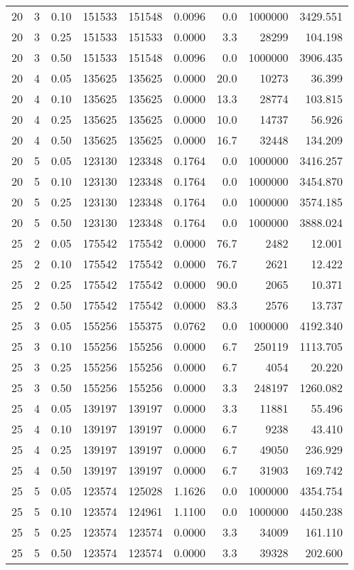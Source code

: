 \begin{table}
\begin{center}
\begin{tabular}{|c|c|c|r|r|c|r|r|r|}
20 & 3 & 0.10 & 151533 & 151548 &  0.0096 & 0.0 & 1000000 & 3429.551 \\
20 & 3 & 0.25 & 151533 & 151533 &  0.0000 & 3.3 & 28299 & 104.198 \\
20 & 3 & 0.50 & 151533 & 151548 &  0.0096 & 0.0 & 1000000 & 3906.435 \\
20 & 4 & 0.05 & 135625 & 135625 &  0.0000 & 20.0 & 10273 & 36.399 \\
20 & 4 & 0.10 & 135625 & 135625 &  0.0000 & 13.3 & 28774 & 103.815 \\
20 & 4 & 0.25 & 135625 & 135625 &  0.0000 & 10.0 & 14737 & 56.926 \\
20 & 4 & 0.50 & 135625 & 135625 &  0.0000 & 16.7 & 32448 & 134.209 \\
20 & 5 & 0.05 & 123130 & 123348 &  0.1764 & 0.0 & 1000000 & 3416.257 \\
20 & 5 & 0.10 & 123130 & 123348 &  0.1764 & 0.0 & 1000000 & 3454.870 \\
20 & 5 & 0.25 & 123130 & 123348 &  0.1764 & 0.0 & 1000000 & 3574.185 \\
20 & 5 & 0.50 & 123130 & 123348 &  0.1764 & 0.0 & 1000000 & 3888.024 \\
25 & 2 & 0.05 & 175542 & 175542 &  0.0000 & 76.7 & 2482 & 12.001 \\
25 & 2 & 0.10 & 175542 & 175542 &  0.0000 & 76.7 & 2621 & 12.422 \\
25 & 2 & 0.25 & 175542 & 175542 &  0.0000 & 90.0 & 2065 & 10.371 \\
25 & 2 & 0.50 & 175542 & 175542 &  0.0000 & 83.3 & 2576 & 13.737 \\
25 & 3 & 0.05 & 155256 & 155375 &  0.0762 & 0.0 & 1000000 & 4192.340 \\
25 & 3 & 0.10 & 155256 & 155256 &  0.0000 & 6.7 & 250119 & 1113.705 \\
25 & 3 & 0.25 & 155256 & 155256 &  0.0000 & 6.7 & 4054 & 20.220 \\
25 & 3 & 0.50 & 155256 & 155256 &  0.0000 & 3.3 & 248197 & 1260.082 \\
25 & 4 & 0.05 & 139197 & 139197 &  0.0000 & 3.3 & 11881 & 55.496 \\
25 & 4 & 0.10 & 139197 & 139197 &  0.0000 & 6.7 & 9238 & 43.410 \\
25 & 4 & 0.25 & 139197 & 139197 &  0.0000 & 6.7 & 49050 & 236.929 \\
25 & 4 & 0.50 & 139197 & 139197 &  0.0000 & 6.7 & 31903 & 169.742 \\
25 & 5 & 0.05 & 123574 & 125028 &  1.1626 & 0.0 & 1000000 & 4354.754 \\
25 & 5 & 0.10 & 123574 & 124961 &  1.1100 & 0.0 & 1000000 & 4450.238 \\
25 & 5 & 0.25 & 123574 & 123574 &  0.0000 & 3.3 & 34009 & 161.110 \\
25 & 5 & 0.50 & 123574 & 123574 &  0.0000 & 3.3 & 39328 & 202.600 \\
\hline
\end{tabular}
\end{center}
\end{table}
